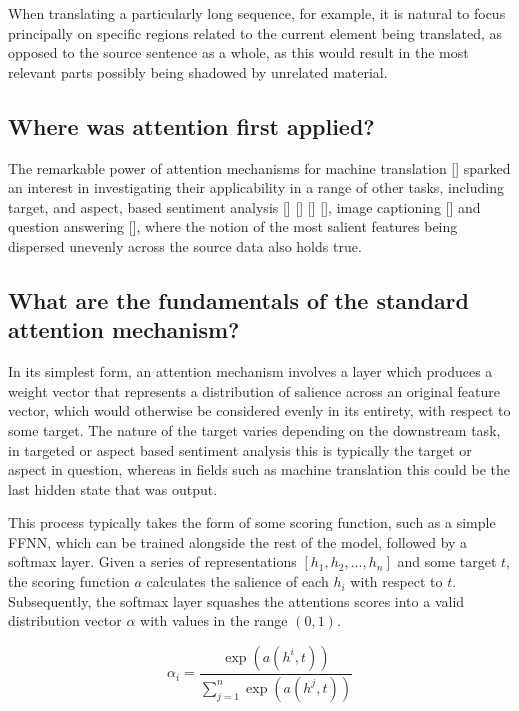 \documentclass[12pt, a4paper]{report}
\theoremstyle{definition}
\theoremstyle{definition}%
\theoremstyle{definition}%
\theoremstyle{definition}%
\theoremstyle{definition}%
\theoremstyle{definition}%
\renewcommand{\cite}[1]{[\citealp{#1}]}
\begin{document}
When translating a particularly long sequence, for example, it is natural to focus principally on specific regions related to the current element being translated, as opposed to the source sentence as a whole, as this would result in the most relevant parts possibly being shadowed by unrelated material.

\subsection{Where was attention first applied?}
The remarkable power of attention mechanisms for machine translation \cite{bahdanau2014} sparked an interest in investigating their applicability in a range of other tasks, including target, and aspect, based sentiment analysis \cite{wang} \cite{chen2017} \cite{dehongma2017} \cite{zheng2018}, image captioning \cite{kelvinxu2015} and question answering \cite{hermann2015}, where the notion of the most salient features being dispersed unevenly across the source data also holds true.

\subsection{What are the fundamentals of the standard attention mechanism?}
In its simplest form, an attention mechanism involves a layer which produces a weight vector that represents a distribution of salience across an original feature vector, which would otherwise be considered evenly in its entirety, with respect to some target. The nature of the target varies depending on the downstream task, in targeted or aspect based sentiment analysis this is typically the target or aspect in question, whereas in fields such as machine translation this could be the last hidden state that was output.

This process typically takes the form of some scoring function, such as a simple FFNN, which can be trained alongside the rest of the model, followed by a softmax layer. Given a series of representations $[h_{1}, h_{2}, ..., h_{n}]$ and some target $t$, the scoring function $a$ calculates the salience of each $h_{i}$ with respect to $t$. Subsequently, the softmax layer squashes the attentions scores into a valid distribution vector $\alpha$ with values in the range $(0, 1)$.

\begin{equation} \label{eq:attention_alignment_model}
	\alpha_{i} = \frac{\exp(a(h^{i},t))}{\sum_{j=1}^{n}\exp(a(h^{j},t))}
\end{equation}
\end{document}
